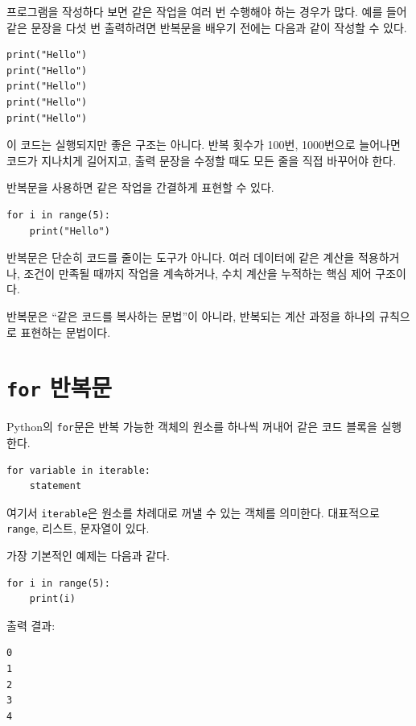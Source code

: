 \documentclass[11pt,a4paper]{article}
\begin{document}
프로그램을 작성하다 보면 같은 작업을 여러 번 수행해야 하는 경우가 많다.
예를 들어 같은 문장을 다섯 번 출력하려면 반복문을 배우기 전에는 다음과 같이 작성할 수 있다.

\begin{lstlisting}
print("Hello")
print("Hello")
print("Hello")
print("Hello")
print("Hello")
\end{lstlisting}

이 코드는 실행되지만 좋은 구조는 아니다. 반복 횟수가 100번, 1000번으로 늘어나면 코드가 지나치게 길어지고, 출력 문장을 수정할 때도 모든 줄을 직접 바꾸어야 한다.

반복문을 사용하면 같은 작업을 간결하게 표현할 수 있다.

\begin{lstlisting}
for i in range(5):
    print("Hello")
\end{lstlisting}

반복문은 단순히 코드를 줄이는 도구가 아니다. 여러 데이터에 같은 계산을 적용하거나, 조건이 만족될 때까지 작업을 계속하거나, 수치 계산을 누적하는 핵심 제어 구조이다.

\begin{importantbox}
반복문은 ``같은 코드를 복사하는 문법''이 아니라, 반복되는 계산 과정을 하나의 규칙으로 표현하는 문법이다.
\end{importantbox}

\section{\texttt{for} 반복문}

Python의 \texttt{for}문은 반복 가능한 객체의 원소를 하나씩 꺼내어 같은 코드 블록을 실행한다.

\begin{lstlisting}
for variable in iterable:
    statement
\end{lstlisting}

여기서 \texttt{iterable}은 원소를 차례대로 꺼낼 수 있는 객체를 의미한다. 대표적으로 \texttt{range}, 리스트, 문자열이 있다.

가장 기본적인 예제는 다음과 같다.

\begin{lstlisting}
for i in range(5):
    print(i)
\end{lstlisting}

출력 결과:

\begin{verbatim}
0
1
2
3
4
\end{verbatim}
\end{document}
